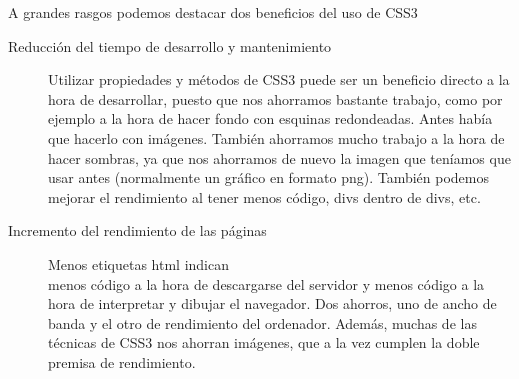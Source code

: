 A grandes rasgos podemos destacar dos beneficios del uso de CSS3
\begin{description}
    \item[Reducción del tiempo de desarrollo y mantenimiento] Utilizar propiedades y métodos de CSS3 puede ser un beneficio directo a la hora
    de desarrollar, puesto que nos ahorramos bastante trabajo, como por ejemplo
    a la hora de hacer fondo con esquinas redondeadas. Antes había que hacerlo
    con imágenes. También ahorramos mucho trabajo a la hora de hacer
    sombras, ya que nos ahorramos de nuevo la imagen que teníamos que usar
    antes (normalmente un gráfico en formato png).
    También podemos mejorar el rendimiento al tener menos código, divs dentro
    de divs, etc.
    \item[Incremento del rendimiento de las páginas] Menos etiquetas html indican\\ menos código a la hora de descargarse del servidor  y menos código a la hora de interpretar y dibujar el navegador. Dos ahorros, uno de ancho de banda y el otro de rendimiento del ordenador. Además, muchas de las técnicas de CSS3 nos ahorran imágenes, que a la vez cumplen la doble premisa de rendimiento.
\end{description}



